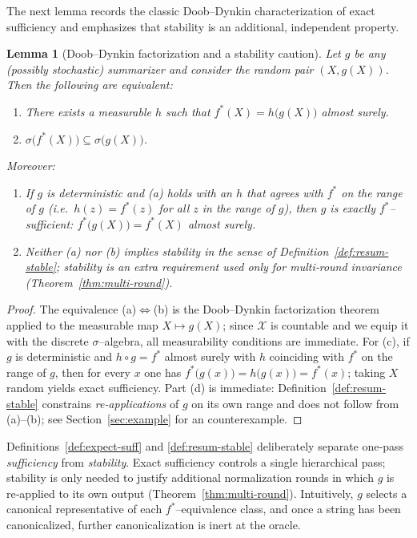 \documentclass[11pt]{article}
\newtheorem{lemma}{Lemma}
\newcommand{\Strings}{\mathcal{X}}       %
\newcommand{\fstar}{f^*}               %
\begin{document}
The next lemma records the classic Doob–Dynkin characterization of exact sufficiency and emphasizes that stability is an additional, independent property.

\begin{lemma}[Doob–Dynkin factorization and a stability caution]\label{lem:doob-dynkin}
Let $g$ be any (possibly stochastic) summarizer and consider the random pair $(X,g(X))$. Then the following are equivalent:
\begin{enumerate}
\item[(a)] There exists a measurable $h$ such that $\fstar(X)=h\big(g(X)\big)$ almost surely.
\item[(b)] $\sigma\!\big(\fstar(X)\big)\subseteq \sigma\!\big(g(X)\big)$.
\end{enumerate}
Moreover:
\begin{enumerate}
\item[(c)] If $g$ is deterministic and (a) holds with an $h$ that agrees with $\fstar$ on the range of $g$ (i.e.\ $h(z)=\fstar(z)$ for all $z$ in the range of $g$), then $g$ is exactly $\fstar$–sufficient: $\fstar\big(g(X)\big)=\fstar(X)$ almost surely.
\item[(d)] Neither (a) nor (b) implies stability in the sense of Definition~\ref{def:resum-stable}; stability is an extra requirement used only for multi‑round invariance (Theorem~\ref{thm:multi-round}).
\end{enumerate}
\end{lemma}

\begin{proof}
The equivalence (a)$\Leftrightarrow$(b) is the Doob–Dynkin factorization theorem applied to the measurable map $X\mapsto g(X)$; since $\Strings$ is countable and we equip it with the discrete $\sigma$–algebra, all measurability conditions are immediate. For (c), if $g$ is deterministic and $h\circ g=\fstar$ almost surely with $h$ coinciding with $\fstar$ on the range of $g$, then for every $x$ one has $\fstar\big(g(x)\big)=h\big(g(x)\big)=\fstar(x)$; taking $X$ random yields exact sufficiency. Part (d) is immediate: Definition~\ref{def:resum-stable} constrains \emph{re‑applications} of $g$ on its own range and does not follow from (a)–(b); see Section~\ref{sec:example} for an counterexample.
\end{proof}

Definitions~\ref{def:expect-suff} and \ref{def:resum-stable} deliberately separate one‑pass \emph{sufficiency} from \emph{stability}. Exact sufficiency controls a single hierarchical pass; stability is only needed to justify additional normalization rounds in which $g$ is re‑applied to its own output (Theorem~\ref{thm:multi-round}). Intuitively, $g$ selects a canonical representative of each $\fstar$–equivalence class, and once a string has been canonicalized, further canonicalization is inert at the oracle.
\end{document}
